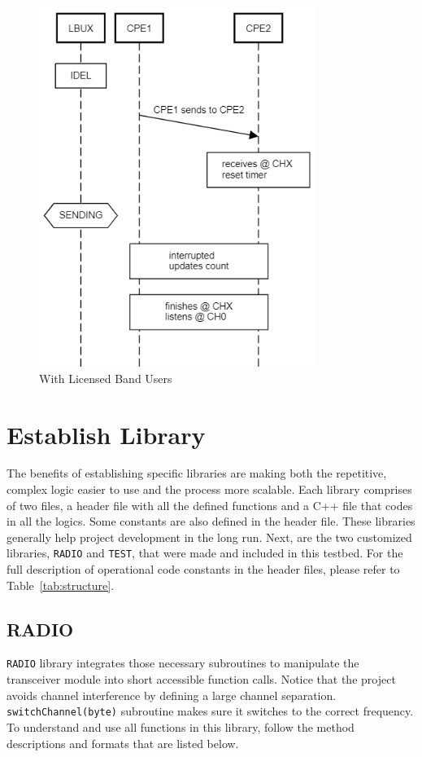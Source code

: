 \begin{figure}[ht]
{\begin{minipage}[c][1.7\width]{
	   0.4\textwidth}
	   \includegraphics[width=0.8\textwidth]{figures/sequence_diagram_interrupt.png}
	\end{minipage}}
\caption{With Licensed Band Users}
\label{fig:with_lbu}
\end{figure}

\section{Establish Library}

The benefits of establishing specific libraries are making both the repetitive, complex logic easier to use and the process more scalable. 
Each library comprises of two files, a header file with all the defined functions and a C++ file that codes in all the logics. Some constants are 
also defined in the header file. These libraries generally help project development in the long run. 
Next, are the two customized libraries, \texttt{RADIO} and \texttt{TEST}, that were made and included in this testbed. For the full description of operational code constants in the header files, please refer to Table~\ref{tab:structure}.

\subsection{RADIO}
\texttt{RADIO} library integrates those necessary subroutines to manipulate the transceiver module into short accessible function calls. Notice that the project avoids channel interference by defining a large channel separation. \texttt{switchChannel(byte)} subroutine makes sure it switches to the correct frequency. To understand and use all functions in this library, follow the method descriptions and formats that are listed below.

